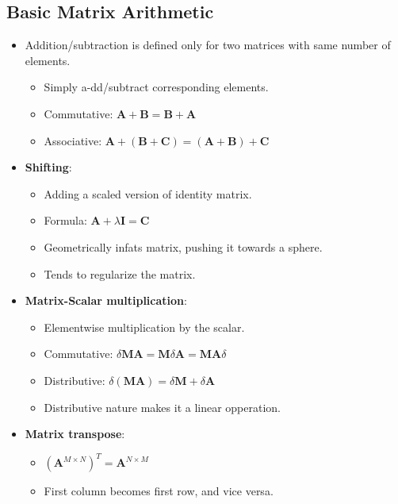 \documentclass[12pt,a4paper]{article}
\begin{document}
\subsection{Basic Matrix Arithmetic}
\begin{itemize}
    \item Addition/subtraction is defined only for two matrices with same number of elements.
        \begin{itemize}
            \item Simply a-dd/subtract corresponding elements.
            \item {\color{true}Commutative}: \(\textbf{A} + \textbf{B} = \textbf{B} + \textbf{A}\)
            \item {\color{true}Associative}: \(\mathbf{A} + (\mathbf{B}+\mathbf{C}) = (\mathbf{A}+\mathbf{B}) + \mathbf{C}\)
        \end{itemize}
    \item \textbf{Shifting}:
        \begin{itemize}
            \item Adding a scaled version of identity matrix.
            \item Formula: \(\textbf{A} + \lambda\bm{I} = \textbf{C}\)
            \item Geometrically infats matrix, pushing it towards a sphere.
            \item Tends to {\color{o-Sun}regularize} the matrix.
        \end{itemize}
    \item \textbf{Matrix-Scalar multiplication}:
        \begin{itemize}
            \item Elementwise multiplication by the scalar.
            \item {\color{true}Commutative}: \(\delta\textbf{MA}=\textbf{M}\delta\textbf{A}=\textbf{MA}\delta\)
            \item {\color{true}Distributive}: \(\delta(\textbf{MA}) = \delta\textbf{M} + \delta{\textbf{A}}\)
            \item Distributive nature makes it a linear opperation.
        \end{itemize}
    \item \textbf{Matrix transpose}:
        \begin{itemize}
            \item \((\textbf{A}^{M\times N})^T = \textbf{A}^{N\times M}\)
            \item First column becomes first row, and vice versa.

\end{itemize}
\end{itemize}
\end{document}
